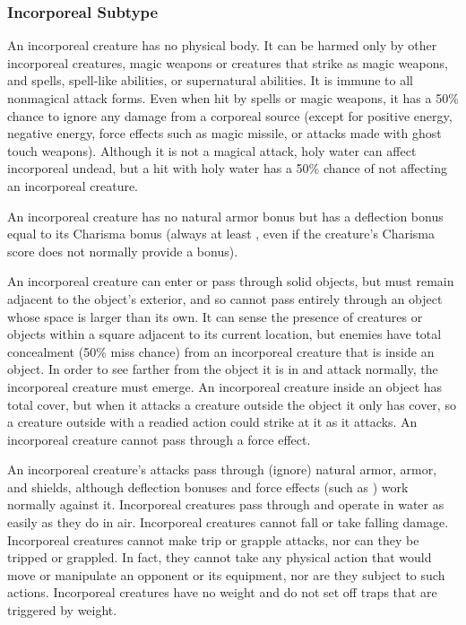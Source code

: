 {\subsubsection{Incorporeal Subtype} An incorporeal creature has no physical body. It can be harmed only by other incorporeal creatures, magic weapons or creatures that strike as magic weapons, and spells, spell-like abilities, or supernatural abilities. It is immune to all nonmagical attack forms. Even when hit by spells or magic weapons, it has a 50\% chance to ignore any damage from a corporeal source (except for positive energy, negative energy, force effects such as magic missile, or attacks made with ghost touch weapons). Although it is not a magical attack, holy water can affect incorporeal undead, but a hit with holy water has a 50\% chance of not affecting an incorporeal creature.

\par An incorporeal creature has no natural armor bonus but has a deflection bonus equal to its Charisma bonus (always at least , even if the creature's Charisma score does not normally provide a bonus). 

\par An incorporeal creature can enter or pass through solid objects, but must remain adjacent to the object's exterior, and so cannot pass entirely through an object whose space is larger than its own. It can sense the presence of creatures or objects within a square adjacent to its current location, but enemies have total concealment (50\% miss chance) from an incorporeal creature that is inside an object. In order to see farther from the object it is in and attack normally, the incorporeal creature must emerge. An incorporeal creature inside an object has total cover, but when it attacks a creature outside the object it only has cover, so a creature outside with a readied action could strike at it as it attacks. An incorporeal creature cannot pass through a force effect.

\par An incorporeal creature's attacks pass through (ignore) natural armor, armor, and shields, although deflection bonuses and force effects (such as ) work normally against it. Incorporeal creatures pass through and operate in water as easily as they do in air. Incorporeal creatures cannot fall or take falling damage. Incorporeal creatures cannot make trip or grapple attacks, nor can they be tripped or grappled. In fact, they cannot take any physical action that would move or manipulate an opponent or its equipment, nor are they subject to such actions. Incorporeal creatures have no weight and do not set off traps that are triggered by weight.

}
